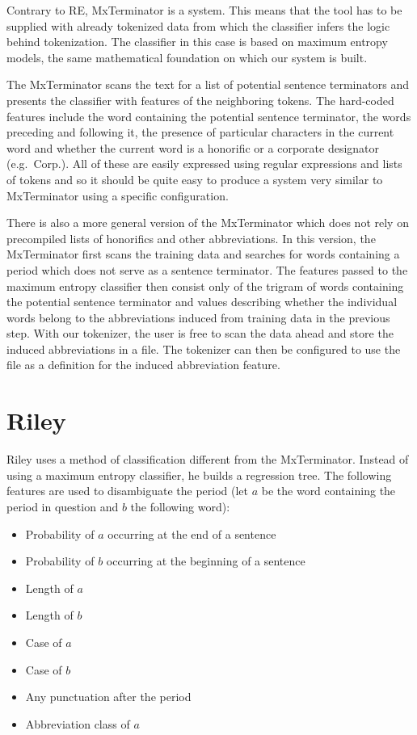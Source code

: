 Contrary to RE, MxTerminator \cite{sbd-mxterm} is a  system. This means that the tool has to be supplied with
already tokenized data from which the classifier infers the logic behind
tokenization. The classifier in this case is based on maximum entropy models,
the same mathematical foundation on which our system is built.

The MxTerminator scans the text for a list of potential sentence terminators
and presents the classifier with features of the neighboring tokens. The
hard-coded features include the word containing the potential sentence
terminator, the words preceding and following it, the presence of particular
characters in the current word and whether the current word is a honorific or a
corporate designator (e.g.\ Corp.). All of these are easily expressed using
regular expressions and lists of tokens and so it should be quite easy to
produce a system very similar to MxTerminator using a specific configuration.

There is also a more general version of the MxTerminator which does not rely on
precompiled lists of honorifics and other abbreviations. In this version, the
MxTerminator first scans the training data and searches for words containing a
period which does not serve as a sentence terminator. The features passed to
the maximum entropy classifier then consist only of the trigram of words
containing the potential sentence terminator and values describing whether the
individual words belong to the abbreviations induced from training data in the
previous step. With our tokenizer, the user is free to scan the data ahead and
store the induced abbreviations in a file. The tokenizer can then be configured
to use the file as a definition for the induced abbreviation feature.

\section{Riley}
\label{sec:survey-riley}

Riley \cite{sbd-riley} uses a method of classification different from the
MxTerminator. Instead of using a maximum entropy classifier, he builds a
regression tree. The following features are used to disambiguate the period
(let $a$ be the word containing the period in question and $b$ the following
word):

\begin{itemize}
  \item Probability of $a$ occurring at the end of a sentence
  \item Probability of $b$ occurring at the beginning of a sentence
  \item Length of $a$
  \item Length of $b$
  \item Case of $a$
  \item Case of $b$
  \item Any punctuation after the period
  \item Abbreviation class of $a$
\end{itemize}

